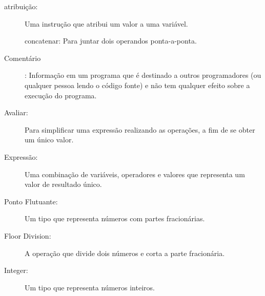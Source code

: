 \begin{description}

\item[atribuição:] Uma instrução que atribui um valor a uma variável.

concatenar: Para juntar dois operandos ponta-a-ponta.

\item[Comentário]: Informação em um programa que é destinado a outros 
programadores (ou qualquer pessoa lendo o código fonte) e não tem qualquer
efeito sobre a execução do programa.

\item[Avaliar:] Para simplificar uma expressão realizando as operações, 
a fim de se obter um único valor.

\item[Expressão:] Uma combinação de variáveis, operadores e valores que representa um
valor de resultado único.

\item[Ponto Flutuante:] Um tipo que representa números com partes 
fracionárias.

\item[Floor Division:] A operação que divide dois números e corta 
a parte fracionária.

\item[Integer:] Um tipo que representa números inteiros.


\end{description}
